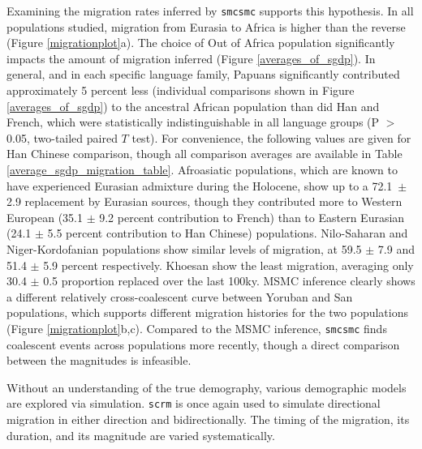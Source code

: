 \documentclass{article}
\begin{document}
Examining the migration rates inferred by {\tt smcsmc} supports this hypothesis. In all populations studied, migration from Eurasia to Africa is higher than the reverse (Figure \ref{migrationplot}a). The choice of Out of Africa population significantly impacts the amount of migration inferred (Figure \ref{averages_of_sgdp}). In general, and in each specific language family, Papuans significantly contributed approximately 5 percent less (individual comparisons shown in Figure \ref{averages_of_sgdp}) to the ancestral African population than did Han and French, which were statistically indistinguishable in all language groups (P $>$ 0.05, two-tailed paired $T$ test). For convenience, the following values are given for Han Chinese comparison, though all comparison averages are available in Table \ref{average_sgdp_migration_table}. Afroasiatic populations, which are known to have experienced Eurasian admixture during the Holocene, show up to a 72.1\ $\pm$ 2.9 replacement by Eurasian sources, though they contributed more to Western European (35.1 $\pm$ 9.2 percent contribution to French) than to Eastern Eurasian (24.1 $\pm$ 5.5 percent contribution to Han Chinese) populations. Nilo-Saharan and Niger-Kordofanian  populations show similar levels of migration, at 59.5 $\pm$ 7.9 and 51.4 $\pm$ 5.9 percent respectively. Khoesan show the least migration, averaging only 30.4 $\pm$ 0.5 proportion replaced over the last 100ky. MSMC inference clearly shows a different relatively cross-coalescent curve between Yoruban and San populations, which supports different migration histories for the two populations (Figure \ref{migrationplot}b,c). Compared to the MSMC inference, {\tt smcsmc} finds coalescent events across populations more recently, though a direct comparison between the magnitudes is infeasible. 

Without an understanding of the true demography, various demographic models are explored via simulation. {\tt scrm} is once again used to simulate directional migration in either direction and bidirectionally. The timing of the migration, its duration, and its magnitude are varied systematically. 
 
\end{document}
